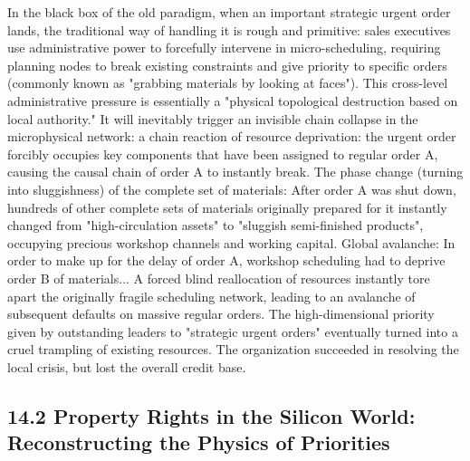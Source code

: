 \documentclass[11pt,a4paper]{article}
\begin{document}
In the black box of the old paradigm, when an important strategic urgent order lands, the traditional way of handling it is rough and primitive: sales executives use administrative power to forcefully intervene in micro-scheduling, requiring planning nodes to break existing constraints and give priority to specific orders (commonly known as "grabbing materials by looking at faces"). This cross-level administrative pressure is essentially a "physical topological destruction based on local authority." It will inevitably trigger an invisible chain collapse in the microphysical network: a chain reaction of resource deprivation: the urgent order forcibly occupies key components that have been assigned to regular order A, causing the causal chain of order A to instantly break. The phase change (turning into sluggishness) of the complete set of materials: After order A was shut down, hundreds of other complete sets of materials originally prepared for it instantly changed from "high-circulation assets" to "sluggish semi-finished products", occupying precious workshop channels and working capital. Global avalanche: In order to make up for the delay of order A, workshop scheduling had to deprive order B of materials... A forced blind reallocation of resources instantly tore apart the originally fragile scheduling network, leading to an avalanche of subsequent defaults on massive regular orders. The high-dimensional priority given by outstanding leaders to "strategic urgent orders" eventually turned into a cruel trampling of existing resources. The organization succeeded in resolving the local crisis, but lost the overall credit base.


\subsection*{14.2 Property Rights in the Silicon World: Reconstructing the Physics of Priorities}
\end{document}
